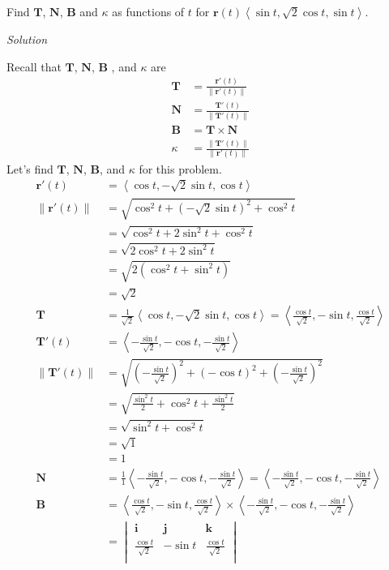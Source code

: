 \documentclass{article}
\newcommand{\lrp}[1]{\left( #1 \right)}
\newcommand{\lra}[1]{\left\langle #1 \right\rangle}
\newcommand{\norm}[1]{\left\lVert #1 \right\rVert}
\renewcommand{\i}[0]{\mathbf{i}}
\renewcommand{\j}[0]{\mathbf{j}}
\renewcommand{\k}[0]{\mathbf{k}}
\newcommand{\T}[0]{\mathbf{T}}
\newcommand{\N}[0]{\mathbf{N}}
\newcommand{\B}[0]{\mathbf{B}}
\renewcommand{\r}[0]{\mathbf{r}}
\newcommand{\Solution}{\textit{Solution}}
\begin{document}
Find $\T$, $\N$, $\B$ and $\kappa$ as functions of $t$ for $\r(t)\lra{\sin t, \sqrt{2}\cos t, \sin t}$.

\Solution

Recall that $\T$, $\N$, $\B$ , and $\kappa$ are
\begin{align*}
    \T&=\frac{\r'(t)}{\lVert \r'(t)\rVert}\\
    \N&=\frac{\T'(t)}{\lVert \T'(t)\rVert}\\
    \B&=\T\times \N\\
    \kappa&=\frac{\lVert \T'(t)\rVert}{\lVert \r'(t)\rVert}
\end{align*}
Let's find $\T$, $\N$, $\B$, and $\kappa$ for this problem.
\begin{align*}
    \r'(t)&=\lra{\cos t, -\sqrt{2}\sin t,\cos t}\\
    \norm{\r'(t)}&=\sqrt{\cos^2 t + \lrp{-\sqrt{2}\sin t}^2+\cos^2t}\\
    &=\sqrt{\cos ^2 t + 2\sin^2 t+\cos^2t}\\
    &=\sqrt{2\cos^2 t+2\sin^2 t}\\
    &=\sqrt{2\lrp{\cos^2 t+\sin^2 t}}\\
    &=\sqrt{2}\tag{$\cos^2 t+\sin^2 t =1$}\\
    \T&=\frac{1}{\sqrt{2}}\lra{\cos t, -\sqrt{2}\sin t,\cos t}=\lra{\frac{\cos t}{\sqrt{2}},-\sin t,\frac{\cos t}{\sqrt{2}}}\\
    \T'(t)&=\lra{-\frac{\sin t}{\sqrt{2}}, -\cos t,-\frac{\sin t}{\sqrt{2}}}\\
    \norm{\T'(t)}&=\sqrt{\lrp{-\frac{\sin t}{\sqrt{2}}}^2+\lrp{-\cos t}^2+\lrp{-\frac{\sin t}{\sqrt{2}}}^2}\\
    &=\sqrt{\frac{\sin^2 t}{2}+\cos ^2 t+\frac{\sin ^2 t}{2}}\\
    &=\sqrt{\sin^2 t+\cos ^2 t}\\
    &=\sqrt{1}\tag{$\sin^2 t+\cos ^2 t=1$}\\
    &=1\\
    \N&=\frac{1}{1}\lra{-\frac{\sin t}{\sqrt{2}}, -\cos t,-\frac{\sin t}{\sqrt{2}}}=\lra{-\frac{\sin t}{\sqrt{2}}, -\cos t,-\frac{\sin t}{\sqrt{2}}}\\
    \B&=\lra{\frac{\cos t}{\sqrt{2}},-\sin t,\frac{\cos t}{\sqrt{2}}}\times \lra{-\frac{\sin t}{\sqrt{2}}, -\cos t,-\frac{\sin t}{\sqrt{2}}}\\
    &=\begin{vmatrix}
    \i & \j & \k\\
    \frac{\cos t}{\sqrt{2}} & -\sin t & \frac{\cos t}{\sqrt{2}}\\

\end{vmatrix}
\end{align*}
\end{document}
